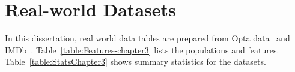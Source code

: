  \section{Real-world Datasets} \label{sec:real-world-data}
 In this dissertation, real world data tables are prepared from Opta data~\cite{opta-original} and IMDb~\cite{IMDb-original}.%
 Table~\ref{table:Features-chapter3} lists the populations and features. Table~\ref{table:StatsChapter3} shows summary statistics for the datasets. 
 
